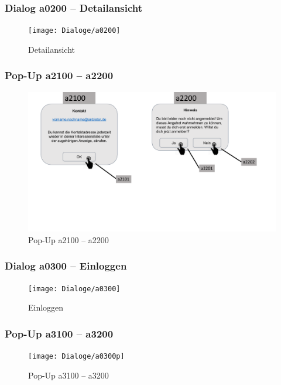 \documentclass[a4paper,12pt,oneside]{scrartcl}
\begin{document}
\newpage
\subsubsection{Dialog a0200 – Detailansicht}
\begin{figure}[!htbp]
\centering
\noindent\texttt{[image: Dialoge/a0200]}
\caption{Detailansicht}
\end{figure}
\FloatBarrier

\newpage
\subsubsection{Pop-Up a2100 – a2200}
\begin{figure}[!htbp]
\centering
\noindent\includegraphics[width=\linewidth,height=\textheight,keepaspectratio]{Dialoge/a0200p}
\caption{Pop-Up a2100 – a2200}
\end{figure}
\FloatBarrier

\newpage
\subsubsection{Dialog a0300 – Einloggen}
\begin{figure}[!htbp]
\centering
\noindent\texttt{[image: Dialoge/a0300]}
\caption{Einloggen}
\end{figure}
\FloatBarrier

\newpage
\subsubsection{Pop-Up a3100 – a3200}
\begin{figure}[!htbp]
\centering
\noindent\texttt{[image: Dialoge/a0300p]}
\caption{Pop-Up a3100 – a3200}
\end{figure}
\FloatBarrier
\end{document}
